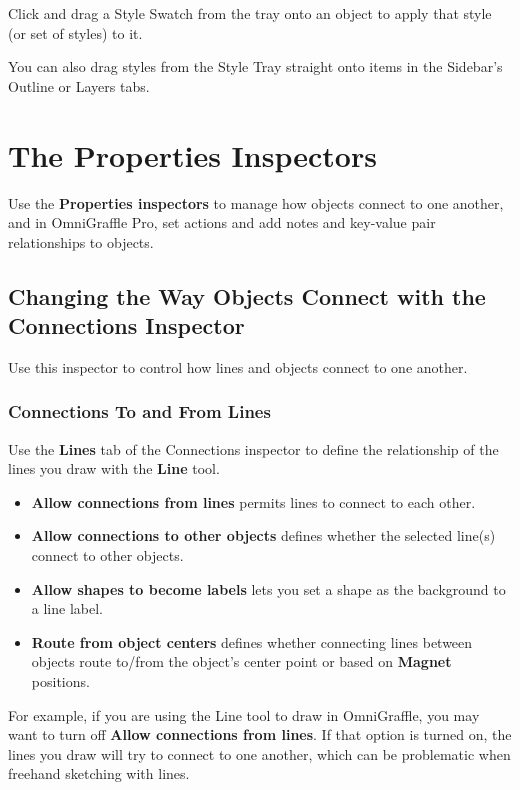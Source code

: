 \documentclass[../main.tex]{subfiles}
\begin{document}
Click and drag a Style Swatch from the tray onto an object to apply that style (or set of
styles) to it.

\begin{ogtip}
  You can also drag styles from the Style Tray straight onto items in the Sidebar's Outline or
  Layers tabs.
\end{ogtip}

\section{The Properties Inspectors}

Use the \textbf{Properties inspectors} to manage how objects connect to one another, and in
OmniGraffle Pro, set actions and add notes and key-value pair relationships to objects.

\subsection{Changing the Way Objects Connect with the Connections Inspector}

Use this inspector to control how lines and objects connect to one another.

\subsubsection{Connections To and From Lines}

Use the \textbf{Lines} tab of the Connections inspector to define the relationship of the lines
you draw with the \textbf{Line} tool.


\begin{itemize}
  \item \textbf{Allow connections from lines} permits lines to connect to each other.
  \item \textbf{Allow connections to other objects} defines whether the selected line(s) connect
    to other objects.
  \item \textbf{Allow shapes to become labels} lets you set a shape as the background to a line
    label.
  \item \textbf{Route from object centers} defines whether connecting lines between objects
    route to/from the object's center point or based on \textbf{Magnet} positions.
\end{itemize}

For example, if you are using the Line tool to draw in OmniGraffle, you may want to turn off
\textbf{Allow connections from lines}. If that option is turned on, the lines you draw will
try to connect to one another, which can be problematic when freehand sketching with lines.
\end{document}
